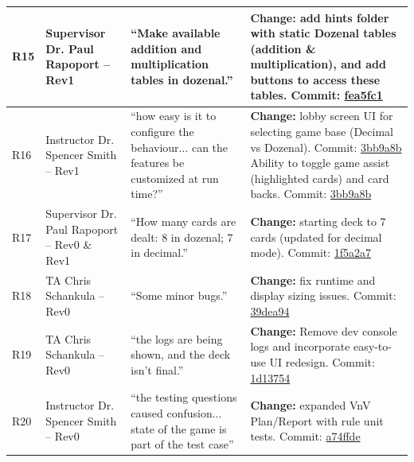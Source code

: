 \documentclass{article}
\begin{document}
\begin{longtable}{p{} p{} p{} p{}}
R15 & Supervisor Dr. Paul Rapoport -- Rev1 & ``Make available addition and multiplication tables in dozenal.'' & \textbf{Change:} add hints folder with static Dozenal tables (addition \& multiplication), and add buttons to access these tables. \newline Commit: \href{https://github.com/The-Crazy-Four-Games/Crazy_1-0s_Game/commit/fea5fc1bc1ec23c9152ad6e10c0846202cf5af18}{fea5fc1} \\
\midrule

R16 & Instructor Dr. Spencer Smith -- Rev1 & ``how easy is it to configure the behaviour... can the features be customized at run time?'' & \textbf{Change:} lobby screen UI for selecting game base (Decimal vs Dozenal). Commit: \href{https://github.com/The-Crazy-Four-Games/Crazy_1-0s_Game/commit/3bb9a8bdc77078b73548373c7f37b51bbb2c6f6f}{3bb9a8b} \newline Ability to toggle game assist (highlighted cards) and card backs. Commit: \href{https://github.com/The-Crazy-Four-Games/Crazy_1-0s_Game/commit/3bb9a8bdc77078b73548373c7f37b51bbb2c6f6f}{3bb9a8b} \\
\midrule

R17 & Supervisor Dr. Paul Rapoport -- Rev0 \& Rev1 & ``How many cards are dealt: 8 in dozenal; 7 in decimal.'' & \textbf{Change:} starting deck to 7 cards (updated for decimal mode). \newline Commit: \href{https://github.com/The-Crazy-Four-Games/Crazy_1-0s_Game/commit/1f5a2a7708a07520b940434f43ccac0bbd2146b6}{1f5a2a7} \\
\midrule

R18 & TA Chris Schankula -- Rev0 & ``Some minor bugs.'' & \textbf{Change:} fix runtime and display sizing issues. \newline Commit: \href{https://github.com/The-Crazy-Four-Games/Crazy_1-0s_Game/commit/39dea941cb4f09fdf4bae406bef423574e82b811}{39dea94} \\
\midrule

R19 & TA Chris Schankula -- Rev0 & ``the logs are being shown, and the deck isn't final.'' & \textbf{Change:} Remove dev console logs and incorporate easy-to-use UI redesign. \newline Commit: \href{https://github.com/The-Crazy-Four-Games/Crazy_1-0s_Game/commit/1d137544ada863356d2c827c14dcb230445d0329}{1d13754} \\
\midrule

R20 & Instructor Dr. Spencer Smith -- Rev0 & ``the testing questions caused confusion... state of the game is part of the test case'' & \textbf{Change:} expanded VnV Plan/Report with rule unit tests. \newline Commit: \href{https://github.com/The-Crazy-Four-Games/Crazy_1-0s_Game/commit/a74ffde8621de412fef53e6ff0711c1e9250717e}{a74ffde} \\
\midrule


\end{longtable}
\end{document}
